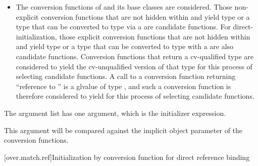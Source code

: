 \begin{itemize}
\item
The conversion functions of
and its base classes are considered.
Those non-explicit conversion functions that are not hidden
within
and yield type
or a type that can be converted to type
via a 
are candidate functions.
For direct-initialization, those explicit conversion functions that are not
hidden within  and yield type  or a type that can be converted
to type  with a  are also
candidate functions.
Conversion functions that return a cv-qualified type
are considered to yield the cv-unqualified version of that type
for this process of selecting candidate functions.
A call to a conversion function returning ``reference to ''
is a glvalue of type , and such a conversion function is
therefore considered to yield  for this process of selecting
candidate functions.
\end{itemize}

\pnum
The argument list has one argument, which is the initializer expression.
\begin{note}
This argument will be compared against
the implicit object parameter of the conversion functions.
\end{note}

[over.match.ref]{Initialization by conversion function for direct reference binding}%

